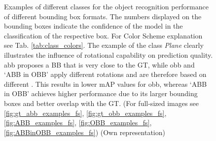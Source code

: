 \begin{figure}[h!]
\begin{tabularx}{\textwidth}{c|*{9}{X}}
\end{tabularx}
\caption[aab and obb: Examples of different classes for the object recognition performance]{Examples of different classes for the object recognition performance of different bounding box formats. The numbers displayed on the bounding boxes indicate the confidence of the model in the classification of the respective box. For Color Scheme explanation see Tab. \ref{tab:class_colors}. The example of the class \textit{Plane} clearly illustrates the influence of rotational capability on prediction quality. \acrshort{abb} proposes a \acrshort{BB} that is very close to the \acrshort{GT}, while \acrshort{obb} and ‘ABB in OBB’ apply different rotations and are therefore based on different . This results in lower \acrshort{mAP} values for \acrshort{obb}, whereas ‘ABB in OBB’ achieves higher performance due to its larger bounding boxes and better overlap with the \acrshort{GT}. (For full-sized images see \ref{fig:gt_abb_examples_fs}, \ref{fig:gt_obb_examples_fs}, \ref{fig:ABB_examples_fs}, \ref{fig:OBB_examples_fs}, \ref{fig:ABBinOBB_examples_fs})  (Own representation)}
\label{fig:aab_obb_example_pics}
\end{figure}
